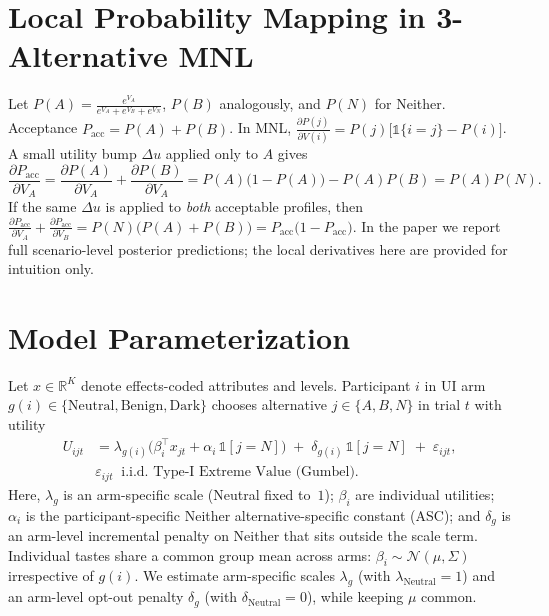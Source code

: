 \documentclass{eusset}
\begin{document}
\section{Local Probability Mapping in 3-Alternative MNL}
\label{app:probmap}
Let $P(A)=\frac{e^{V_A}}{e^{V_A}+e^{V_B}+e^{V_N}}$, $P(B)$ analogously, and $P(N)$ for Neither. Acceptance $P_{\mathrm{acc}}=P(A)+P(B)$. In MNL,
$\frac{\partial P(j)}{\partial V(i)}=P(j)\big[\mathbb{1}\{i=j\}-P(i)\big]$.
A small utility bump $\Delta u$ applied only to $A$ gives
\[
\frac{\partial P_{\mathrm{acc}}}{\partial V_A}
= \frac{\partial P(A)}{\partial V_A} + \frac{\partial P(B)}{\partial V_A}
= P(A)\big(1-P(A)\big) - P(A)P(B)
= P(A)P(N).
\]
If the same $\Delta u$ is applied to \emph{both} acceptable profiles, then
$\frac{\partial P_{\mathrm{acc}}}{\partial V_A} + \frac{\partial P_{\mathrm{acc}}}{\partial V_B}
= P(N)\big(P(A)+P(B)\big) = P_{\mathrm{acc}}\big(1-P_{\mathrm{acc}}\big).$
In the paper we report full scenario-level posterior predictions; the local derivatives here are provided for intuition only.
\section{Model Parameterization}
\label{app:model_detail}
Let $x\in\mathbb{R}^K$ denote effects-coded attributes and levels. Participant $i$ in UI arm $g(i)\in\{\text{Neutral},\text{Benign},\text{Dark}\}$ chooses alternative $j\in\{A,B,N\}$ in trial $t$ with utility
\begin{equation}\label{eq:hetMNL}
\begin{aligned}
U_{ijt}
&= \lambda_{g(i)}\Big(\beta_i^\top x_{jt} + \alpha_i\,\mathbb{1}[j=N]\Big)
\;+\; \delta_{g(i)}\,\mathbb{1}[j=N]
\;+\; \varepsilon_{ijt},\\[2pt]
&\varepsilon_{ijt}\;\;\text{i.i.d.\ Type-I Extreme Value (Gumbel)}.
\end{aligned}
\end{equation}
Here, $\lambda_{g}$ is an arm-specific scale (Neutral fixed to~$1$); $\beta_i$ are individual utilities; $\alpha_i$ is the participant-specific Neither alternative-specific constant (ASC); and $\delta_g$ is an arm-level incremental penalty on Neither that sits outside the scale term. Individual tastes share a common group mean across arms: $\beta_i\sim \mathcal{N}(\mu,\Sigma)$ irrespective of $g(i)$. We estimate arm-specific scales $\lambda_g$ (with $\lambda_{\text{Neutral}}{=}1$) and an arm-level opt-out penalty $\delta_g$ (with $\delta_{\text{Neutral}}{=}0$), while keeping $\mu$ common.
\end{document}
